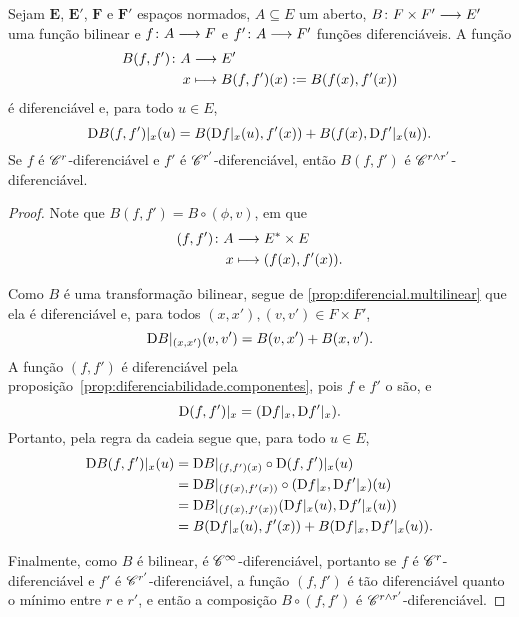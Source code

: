 \begin{proposition}
\label{prop:diferenciabilidade.avaliacao.bilinear}
Sejam $\bm E$, $\bm E'$, $\bm F$ e $\bm F'$ espaços normados, $A \subseteq E$ um aberto, $B\colon \allowbreak F \times F' \longrightarrow E'$ uma função bilinear e $f\colon \allowbreak A \longrightarrow F$ e $f'\colon \allowbreak A \longrightarrow F'$ funções diferenciáveis. A função
	\begin{align*}
	{B(f,f')}\colon {A} &\longrightarrow {E'} \\{x} &\longmapsto B(f,f')(x) := B(f(x),f'(x))
	\end{align*}
é diferenciável e, para todo $u \in E$,
	\begin{equation*}
	\mathrm{D} B(f,f')|_x(u) = B(\mathrm{D} f|_x(u),f'(x)) + B(f(x), \mathrm{D} f'|_x(u)).
	\end{equation*}
Se $f$ é $\mathscr{C}^r$-diferenciável e $f'$ é $\mathscr{C}^{r'}$-diferenciável, então $B(f,f')$ é $\mathscr{C}^{r \mathbin{\wedge} r'}$-diferenciável.
\end{proposition}
\begin{proof}
Note que $B(f,f') = B \circ (\phi,v)$, em que
	\begin{align*}
	{(f, f')}\colon {A} &\longrightarrow {E^{\ast}\times E} \\{x} &\longmapsto (f(x), f'(x)).
	\end{align*}

Como $B$ é uma transformação bilinear, segue de \ref{prop:diferencial.multilinear} que ela é diferenciável e, para todos $(x,x'), (v,v') \in F \times F'$,
	\begin{equation*}
	\mathrm{D} B|_{(x,x')}(v,v') = B(v,x') + B(x,v').
	\end{equation*}
A função $(f,f')$ é diferenciável pela proposição~\ref{prop:diferenciabilidade.componentes}, pois $f$ e $f'$ o são, e
	\begin{equation*}
	\mathrm{D} (f,f')|_x = (\mathrm{D} f|_x, \mathrm{D} f'|_x).
	\end{equation*}
Portanto, pela regra da cadeia segue que, para todo $u \in E$,
	\begin{align*}
	\mathrm{D} B(f,f')|_x(u) &= \mathrm{D} B|_{(f,f')(x)} \circ \mathrm{D} (f,f')|_x(u) \\
		&= \mathrm{D} B|_{(f(x),f'(x))} \circ (\mathrm{D} f|_x,\mathrm{D} f'|_x)(u) \\
		&= \mathrm{D} B|_{(f(x),f'(x))} (\mathrm{D} f|_x(u),\mathrm{D} f'|_x(u)) \\
		&= B(\mathrm{D} f|_x(u), f'(x)) + B(\mathrm{D} f|_x, \mathrm{D} f'|_x(u)).
	\end{align*}

Finalmente, como $B$ é bilinear, é $\mathscr{C}^\infty$-diferenciável, portanto se $f$ é $\mathscr{C}^r$- diferenciável e $f'$ é $\mathscr{C}^{r'}$-diferenciável, a função $(f,f')$ é tão diferenciável quanto o mínimo entre $r$ e $r'$, e então a composição $B \circ (f,f')$ é $\mathscr{C}^{r \mathbin{\wedge} r'}$-diferenciável.
\end{proof}








